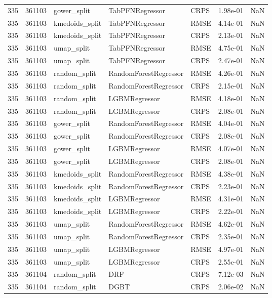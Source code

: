 \begin{tabular}{rrlllrr}
335 & 361103 & gower\_split & TabPFNRegressor & CRPS & 1.98e-01 & NaN \\
335 & 361103 & kmedoids\_split & TabPFNRegressor & RMSE & 4.14e-01 & NaN \\
335 & 361103 & kmedoids\_split & TabPFNRegressor & CRPS & 2.13e-01 & NaN \\
335 & 361103 & umap\_split & TabPFNRegressor & RMSE & 4.75e-01 & NaN \\
335 & 361103 & umap\_split & TabPFNRegressor & CRPS & 2.47e-01 & NaN \\
335 & 361103 & random\_split & RandomForestRegressor & RMSE & 4.26e-01 & NaN \\
335 & 361103 & random\_split & RandomForestRegressor & CRPS & 2.15e-01 & NaN \\
335 & 361103 & random\_split & LGBMRegressor & RMSE & 4.18e-01 & NaN \\
335 & 361103 & random\_split & LGBMRegressor & CRPS & 2.08e-01 & NaN \\
335 & 361103 & gower\_split & RandomForestRegressor & RMSE & 4.04e-01 & NaN \\
335 & 361103 & gower\_split & RandomForestRegressor & CRPS & 2.08e-01 & NaN \\
335 & 361103 & gower\_split & LGBMRegressor & RMSE & 4.07e-01 & NaN \\
335 & 361103 & gower\_split & LGBMRegressor & CRPS & 2.08e-01 & NaN \\
335 & 361103 & kmedoids\_split & RandomForestRegressor & RMSE & 4.38e-01 & NaN \\
335 & 361103 & kmedoids\_split & RandomForestRegressor & CRPS & 2.23e-01 & NaN \\
335 & 361103 & kmedoids\_split & LGBMRegressor & RMSE & 4.31e-01 & NaN \\
335 & 361103 & kmedoids\_split & LGBMRegressor & CRPS & 2.22e-01 & NaN \\
335 & 361103 & umap\_split & RandomForestRegressor & RMSE & 4.62e-01 & NaN \\
335 & 361103 & umap\_split & RandomForestRegressor & CRPS & 2.35e-01 & NaN \\
335 & 361103 & umap\_split & LGBMRegressor & RMSE & 4.97e-01 & NaN \\
335 & 361103 & umap\_split & LGBMRegressor & CRPS & 2.55e-01 & NaN \\
335 & 361104 & random\_split & DRF & CRPS & 7.12e-03 & NaN \\
335 & 361104 & random\_split & DGBT & CRPS & 2.06e-02 & NaN \\

\end{tabular}
